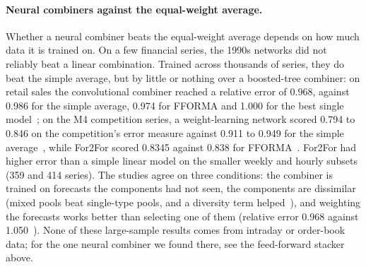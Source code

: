 \paragraph{Neural combiners against the equal-weight average.} Whether a neural combiner beats the equal-weight average depends on how much data it is trained on. On a few
financial series, the 1990s networks did not reliably beat a linear combination. Trained across thousands of
series, they do beat the simple average, but by little or nothing over a boosted-tree combiner: on retail
sales the convolutional combiner reached a relative error of 0.968, against 0.986 for the simple average,
0.974 for FFORMA and 1.000 for the best single model~\citep{mafildes2021}; on the M4 competition series, a
weight-learning network scored 0.794 to 0.846 on the competition's error measure against 0.911 to 0.949 for
the simple average~\citep{felici2026mtl}, while For2For scored 0.8345 against 0.838 for
FFORMA~\citep{zhao2020for2for}. For2For had higher error than a simple linear model on the smaller weekly and hourly subsets
(359 and 414 series). The studies agree on three conditions: the combiner is trained on forecasts the
components had not seen, the components are dissimilar (mixed pools beat single-type pools, and a diversity
term helped~\citep{mafildes2021,felici2026mtl}), and weighting the forecasts works better than selecting one
of them (relative error 0.968 against 1.050~\citep{mafildes2021}). None of these large-sample results comes
from intraday or order-book data; for the one neural combiner we found there, see the feed-forward stacker above.

